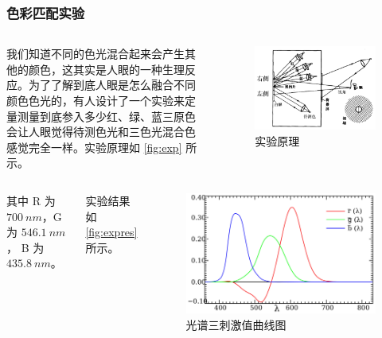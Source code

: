 \documentclass[8pt, aspectratio=169]{ctexbeamer}
\begin{document}
\begin{frame}[allowframebreaks]
	\frametitle{色彩匹配实验}

	\begin{columns}
		我们知道不同的色光混合起来会产生其他的颜色，这其实是人眼的一种生理反应。为了了解到底人眼是怎么融合不同颜色色光的，有人设计了一个实验来定量测量到底参入多少红、绿、蓝三原色会让人眼觉得待测色光和三色光混合色感觉完全一样。实验原理如 \autoref{fig:exp} 所示。


		\begin{figure}
			\includegraphics[width=\linewidth]{exp.png}
			\caption{实验原理}
			\label{fig:exp}
		\end{figure}
	\end{columns}

	\newpage

	\begin{columns}
		\column{0.5\textwidth}
		其中 R 为 $\SI{700}{nm}$，G 为 $\SI{546.1}{nm}$， B 为 $\SI{435.8}{nm}$。

		实验结果如 \autoref{fig:expres} 所示。


		\column{0.5\textwidth}
		\begin{figure}
			\includegraphics[width=\linewidth]{ciji.png}
			\caption{光谱三刺激值曲线图}
			\label{fig:expres}
		\end{figure}
	\end{columns}


\end{frame}
\end{document}
